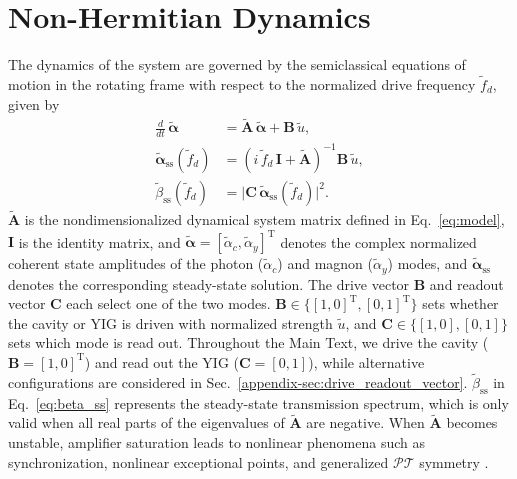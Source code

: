 \documentclass[%
  reprint,
  amsmath,amssymb,
  aps,
  prapplied,
  superscriptaddress,
  longbibliography]{revtex4-2}
\begin{document}
\section{\label{sec:dynamics} Non-Hermitian Dynamics}

The dynamics of the system are governed by the semiclassical equations of motion in the rotating frame with respect to the normalized drive frequency $\tilde{f}_d$, given by
\begin{align}
\frac{d}{dt}\,\tilde{\boldsymbol{\alpha}} &= \tilde{\boldsymbol{A}}\,\tilde{\boldsymbol{\alpha}} + \boldsymbol{B}\,\tilde{u}, \label{eq:time_dep}\\
\tilde{\boldsymbol{\alpha}}_{\mathrm{ss}}(\tilde{f}_d) &= (i\,\tilde{f}_d\,\boldsymbol{I} + \tilde{\boldsymbol{A}})^{-1}\boldsymbol{B}\,\tilde{u}, \label{eq:alpha_ss}\\
\tilde{\beta}_{\mathrm{ss}}(\tilde{f}_d) &= \bigl|\boldsymbol{C}\,\tilde{\boldsymbol{\alpha}}_{\mathrm{ss}}(\tilde{f}_d)\bigr|^2. \label{eq:beta_ss}
\end{align}
$\tilde{\boldsymbol{A}}$ is the nondimensionalized dynamical system matrix defined in Eq.~\ref{eq:model}, $\boldsymbol{I}$ is the identity matrix, and $\tilde{\boldsymbol{\alpha}} = [\tilde{\alpha}_c, \tilde{\alpha}_y]^{\mathrm T}$ denotes the complex normalized coherent state amplitudes of the photon ($\tilde{\alpha}_c$) and magnon ($\tilde{\alpha}_y$) modes, and $\tilde{\boldsymbol{\alpha}}_{\mathrm{ss}}$ denotes the corresponding steady-state solution. The drive vector $\boldsymbol{B}$ and readout vector $\boldsymbol{C}$ each select one of the two modes. $\boldsymbol{B} \in \{[1,0]^{\mathrm T}, [0,1]^{\mathrm T}\}$ sets whether the cavity or YIG is driven with normalized strength $\tilde{u}$, and $\boldsymbol{C} \in \{[1,0], [0,1]\}$ sets which mode is read out. Throughout the Main Text, we drive the cavity ($\boldsymbol{B} = [1,0]^{\mathrm T}$) and read out the YIG ($\boldsymbol{C} = [0,1]$), while alternative configurations are considered in Sec.~\ref{appendix-sec:drive_readout_vector}. $\tilde{\beta}_{\mathrm{ss}}$ in Eq.~\ref{eq:beta_ss} represents the steady-state transmission spectrum, which is only valid when all real parts of the eigenvalues of $\tilde{\boldsymbol{A}}$ are negative. When $\tilde{\boldsymbol{A}}$ becomes unstable, amplifier saturation leads to nonlinear phenomena such as synchronization, nonlinear exceptional points, and generalized $\mathcal{PT}$ symmetry \cite{bai_nonlinear_2023, salcedo-gallo_demonstration_2025, wu_generalized_2022}.
\end{document}
